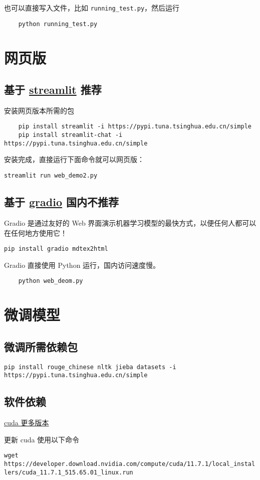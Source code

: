 \documentclass{article}
\begin{document}
也可以直接写入文件，比如 \verb|running_test.py|，然后运行
\begin{verbatim}
    python running_test.py
\end{verbatim}

\section{网页版}
\subsection{基于 \href{https://streamlit.io/}{streamlit} 推荐}
安装网页版本所需的包
\begin{verbatim}
    pip install streamlit -i https://pypi.tuna.tsinghua.edu.cn/simple
    pip install streamlit-chat -i https://pypi.tuna.tsinghua.edu.cn/simple
\end{verbatim}

安装完成，直接运行下面命令就可以网页版：

\verb|streamlit run web_demo2.py|

\subsection{基于 \href{https://www.gradio.app/}{gradio} 国内不推荐}
Gradio 是通过友好的 Web 界面演示机器学习模型的最快方式，以便任何人都可以在任何地方使用它！

\verb|pip install gradio mdtex2html|

Gradio 直接使用 Python 运行，国内访问速度慢。
\begin{verbatim}
    python web_deom.py
\end{verbatim}

\section{微调模型}
\subsection{微调所需依赖包}
\verb|pip install rouge_chinese nltk jieba datasets -i https://pypi.tuna.tsinghua.edu.cn/simple|
\subsection{软件依赖}
\href{https://developer.nvidia.com/cuda-toolkit-archive}{cuda 更多版本}

更新 cuda 使用以下命令

\verb|wget https://developer.download.nvidia.com/compute/cuda/11.7.1/local_installers/cuda_11.7.1_515.65.01_linux.run|
\end{document}

